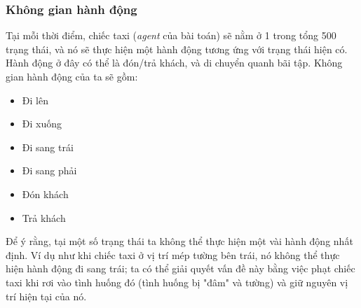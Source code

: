 \documentclass[12pt,a4paper]{report}
\begin{document}
\subsubsection{Không gian hành động}
Tại mỗi thời điểm, chiếc taxi (\textit{agent} của bài toán) sẽ nằm ở 1 trong tổng 500 trạng thái,
và nó sẽ thực hiện một hành động tương ứng với trạng thái hiện có. Hành động ở đây có thể
là đón/trả khách, và di chuyển quanh bãi tập. Không gian hành động của ta sẽ gồm:
\begin{itemize}
	\item Đi lên
	\item Đi xuống
	\item Đi sang trái
	\item Đi sang phải
	\item Đón khách
	\item Trả khách
\end{itemize}
Để ý rằng, tại một số trạng thái ta không thể thực hiện một vài hành động nhất định. Ví
dụ như khi chiếc taxi ở vị trí mép tường bên trái, nó không thể thực hiện hành động đi sang
trái; ta có thể giải quyết vấn đề này bằng việc phạt chiếc taxi khi rơi vào tình huống đó (tình
huống bị "đâm" và tường) và giữ nguyên vị trí hiện tại của nó.
\end{document}
